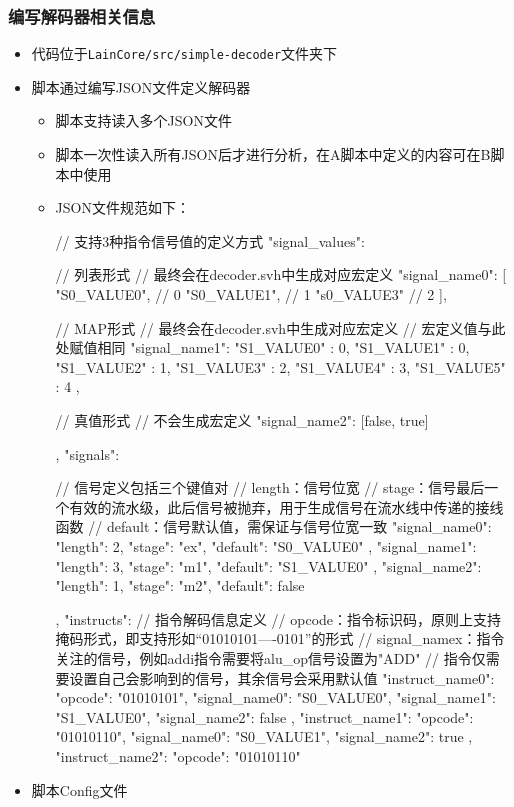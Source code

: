 \subsubsection{编写解码器相关信息}\label{sec:04-advanced-cpu-015}

\begin{itemize}
\item
  代码位于\texttt{LainCore/src/simple-decoder}文件夹下
\item
  脚本通过编写JSON文件定义解码器

  \begin{itemize}
  \item
    脚本支持读入多个JSON文件
  \item
    脚本一次性读入所有JSON后才进行分析，在A脚本中定义的内容可在B脚本中使用
  \item
    JSON文件规范如下：

\begin{CodeBlock}[language=BookJSON]
{
  // 支持3种指令信号值的定义方式
  "signal_values": {
    // 列表形式
    // 最终会在decoder.svh中生成对应宏定义
    "signal_name0": [
      "S0_VALUE0",  // 0
      "S0_VALUE1",  // 1
      "s0_VALUE3"   // 2
    ],

		// MAP形式
    // 最终会在decoder.svh中生成对应宏定义
    // 宏定义值与此处赋值相同
    "signal_name1": {
      "S1_VALUE0" : 0,
      "S1_VALUE1" : 0,
      "S1_VALUE2" : 1,
      "S1_VALUE3" : 2,
      "S1_VALUE4" : 3,
      "S1_VALUE5" : 4
    },

    // 真值形式
    // 不会生成宏定义
    "signal_name2": [false, true]
  },
  "signals": {
    // 信号定义包括三个键值对
    // length：信号位宽
    // stage：信号最后一个有效的流水级，此后信号被抛弃，用于生成信号在流水线中传递的接线函数
    // default：信号默认值，需保证与信号位宽一致
    "signal_name0": {
      "length": 2,
      "stage": "ex",
      "default": "S0_VALUE0"
    },
    "signal_name1": {
      "length": 3,
      "stage": "m1",
      "default": "S1_VALUE0"
    },
    "signal_name2": {
      "length": 1,
      "stage": "m2",
      "default": false
    }

  },
  "instructs": {
    // 指令解码信息定义
    // opcode：指令标识码，原则上支持掩码形式，即支持形如“01010101----0101”的形式
    // signal_namex：指令关注的信号，例如addi指令需要将alu_op信号设置为"ADD"
    // 指令仅需要设置自己会影响到的信号，其余信号会采用默认值
    "instruct_name0": {
      "opcode": "01010101",
      "signal_name0": "S0_VALUE0",
      "signal_name1": "S1_VALUE0",
      "signal_name2": false
    },
    "instruct_name1": {
      "opcode": "01010110",
      "signal_name0": "S0_VALUE1",
      "signal_name2": true
    },
    "instruct_name2": {
      "opcode": "01010110"
    }
  }
}
\end{CodeBlock}
  \end{itemize}
\item
  脚本Config文件


\end{itemize}

